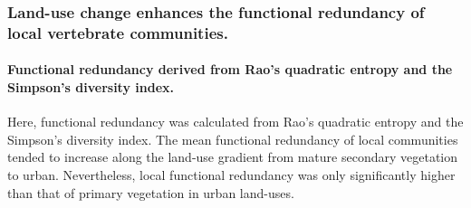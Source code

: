 \subsubsection{Land-use change enhances the functional redundancy of local vertebrate communities.}

\paragraph{Functional redundancy derived from Rao's quadratic entropy and the Simpson's diversity index.}
Here, functional redundancy was calculated from Rao's quadratic entropy and the Simpson's diversity index. The mean functional redundancy of local communities tended to increase along the land-use gradient from mature secondary vegetation to urban. Nevertheless, local functional redundancy was only significantly higher than that of primary vegetation in urban land-uses. 

